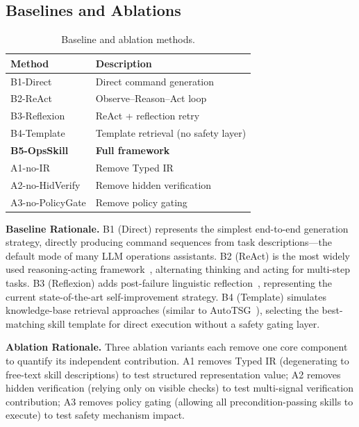 \documentclass[conference,10pt]{IEEEtran}
\begin{document}
\subsection{Baselines and Ablations}

\begin{table}[t]
\centering
\caption{Baseline and ablation methods.}
\label{tab:methods}
\small
\begin{tabular}{ll}
\toprule
\textbf{Method} & \textbf{Description} \\
\midrule
B1-Direct     & Direct command generation \\
B2-ReAct      & Observe--Reason--Act loop~\cite{yao2023react} \\
B3-Reflexion  & ReAct + reflection retry~\cite{shinn2023reflexion} \\
B4-Template   & Template retrieval (no safety layer) \\
\textbf{B5-OpsSkill} & \textbf{Full framework} \\
\midrule
A1-no-IR        & Remove Typed IR \\
A2-no-HidVerify & Remove hidden verification \\
A3-no-PolicyGate & Remove policy gating \\
\bottomrule
\end{tabular}
\end{table}

\noindent\textbf{Baseline Rationale.}
B1 (Direct) represents the simplest end-to-end generation strategy, directly producing command sequences from task descriptions---the default mode of many LLM operations assistants.
B2 (ReAct) is the most widely used reasoning-acting framework~\cite{yao2023react}, alternating thinking and acting for multi-step tasks.
B3 (Reflexion) adds post-failure linguistic reflection~\cite{shinn2023reflexion}, representing the current state-of-the-art self-improvement strategy.
B4 (Template) simulates knowledge-base retrieval approaches (similar to AutoTSG~\cite{shetty2022autotsg}), selecting the best-matching skill template for direct execution without a safety gating layer.

\noindent\textbf{Ablation Rationale.}
Three ablation variants each remove one core component to quantify its independent contribution.
A1 removes Typed IR (degenerating to free-text skill descriptions) to test structured representation value;
A2 removes hidden verification (relying only on visible checks) to test multi-signal verification contribution;
A3 removes policy gating (allowing all precondition-passing skills to execute) to test safety mechanism impact.
\end{document}
